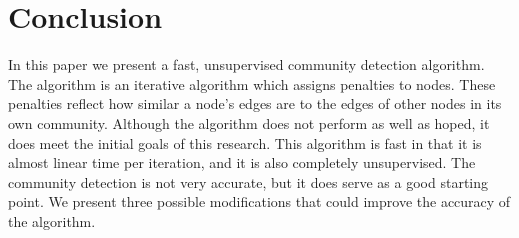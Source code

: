 \documentclass[12pt]{article}
\begin{document}
\section{Conclusion}
\label{sec:Conclusion}

In this paper we present a fast, unsupervised community detection algorithm. The
algorithm is an iterative algorithm which assigns penalties to nodes. These
penalties reflect how similar a node's edges are to the edges of other nodes  in
its own community. Although the algorithm does not perform as well as hoped, it
does meet the initial goals of this research. This algorithm is fast in that it
is almost linear time per iteration, and it is also completely unsupervised. The
community detection is not very accurate, but it does serve as a good starting
point. We present three possible modifications that could improve the accuracy
of the algorithm.


\singlespacing
\newpage


\end{document}
